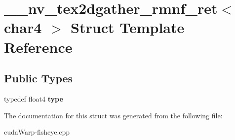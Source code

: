 \hypertarget{struct____nv__tex2dgather__rmnf__ret_3_01char4_01_4}{}\section{\+\_\+\+\_\+nv\+\_\+tex2dgather\+\_\+rmnf\+\_\+ret$<$ char4 $>$ Struct Template Reference}
\label{struct____nv__tex2dgather__rmnf__ret_3_01char4_01_4}
\subsection*{Public Types}
\begin{DoxyCompactItemize}
\item 
typedef float4 {\bfseries type}\hypertarget{struct____nv__tex2dgather__rmnf__ret_3_01char4_01_4_aa2bbfd3ec3b301dde65169460e440609}{}\label{struct____nv__tex2dgather__rmnf__ret_3_01char4_01_4_aa2bbfd3ec3b301dde65169460e440609}

\end{DoxyCompactItemize}


The documentation for this struct was generated from the following file\+:\begin{DoxyCompactItemize}
\item 
cuda\+Warp-\/fisheye.\+cpp\end{DoxyCompactItemize}
